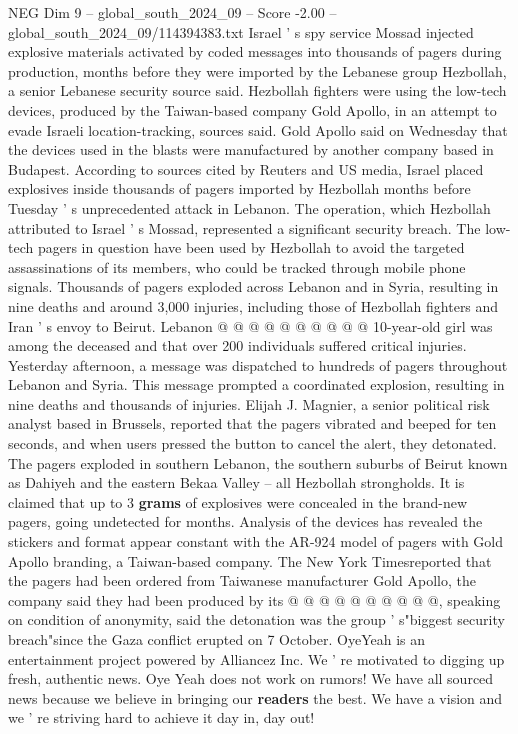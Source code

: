 \begin{textsample}{NEG Dim 9 – global\_south\_2024\_09 – Score -2.00 – global\_south\_2024\_09/114394383.txt}  \label{ex:f9_neg_200}
Israel ' s spy service Mossad injected explosive materials activated by coded messages into thousands of pagers during production, months before they were imported by the Lebanese group Hezbollah, a senior Lebanese security source said.
Hezbollah fighters were using the low-tech devices, produced by the Taiwan-based company Gold Apollo, in an attempt to evade Israeli location-tracking, sources said.
Gold Apollo said on Wednesday that the devices used in the blasts were manufactured by another company based in Budapest.
According to sources cited by Reuters and US media, Israel placed explosives inside thousands of pagers imported by Hezbollah months before Tuesday ' s unprecedented attack in Lebanon.
The operation, which Hezbollah attributed to Israel ' s Mossad, represented a significant security breach.
The low-tech pagers in question have been used by Hezbollah to avoid the targeted assassinations of its members, who could be tracked through mobile phone signals.
Thousands of pagers exploded across Lebanon and in Syria, resulting in nine deaths and around 3,000 injuries, including those of Hezbollah fighters and Iran ' s envoy to Beirut.
Lebanon @ @ @ @ @ @ @ @ @ @ 10-year-old girl was among the deceased and that over 200 individuals suffered critical injuries.
Yesterday afternoon, a message was dispatched to hundreds of pagers throughout Lebanon and Syria.
This message prompted a coordinated explosion, resulting in nine deaths and thousands of injuries.
Elijah J.
Magnier, a senior political risk analyst based in Brussels, reported that the pagers vibrated and beeped for ten seconds, and when users pressed the button to cancel the alert, they detonated.
The pagers exploded in southern Lebanon, the southern suburbs of Beirut known as Dahiyeh and the eastern Bekaa Valley -- all Hezbollah strongholds.
It is claimed that up to 3 \textbf{grams} of explosives were concealed in the brand-new pagers, going undetected for months.
Analysis of the devices has revealed the stickers and format appear constant with the AR-924 model of pagers with Gold Apollo branding, a Taiwan-based company.
The New York Timesreported that the pagers had been ordered from Taiwanese manufacturer Gold Apollo, the company said they had been produced by its @ @ @ @ @ @ @ @ @ @, speaking on condition of anonymity, said the detonation was the group ' s"biggest security breach"since the Gaza conflict erupted on 7 October.
OyeYeah is an entertainment project powered by Alliancez Inc.
We ' re motivated to digging up fresh, authentic news.
Oye Yeah does not work on rumors!
We have all sourced news because we believe in bringing our \textbf{readers} the best.
We have a vision and we ' re striving hard to achieve it day in, day out!

\end{textsample}

